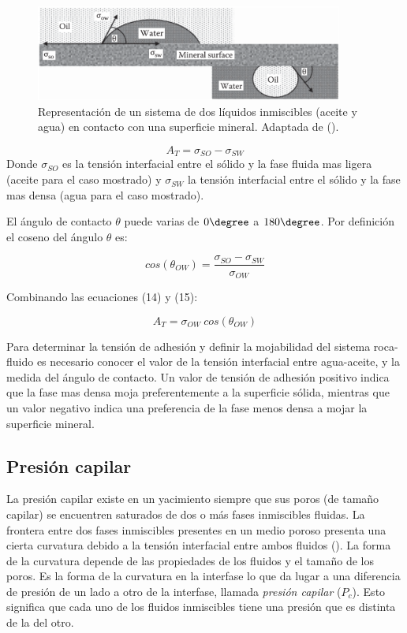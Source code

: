 \begin{figure}
    \centering
    \includegraphics[width=0.9\textwidth]{Graphics/moja1.png}
    \caption[Mojabilidad]{Representación de un sistema de dos líquidos inmiscibles (aceite y agua) en contacto con una superficie mineral. Adaptada de (\cite{Dandekar}).}
    \label{fig:moja1}
\end{figure}

\begin{equation}
A_{T}=\sigma_{SO}-\sigma_{SW}
\end{equation}
Donde $\sigma_{SO}$ es la tensión interfacial entre el sólido y la fase fluida mas ligera (aceite para el caso mostrado) y $\sigma_{SW}$ la tensión interfacial entre el sólido y la fase mas densa (agua para el caso mostrado).

El ángulo de contacto $\theta$ puede varias de $0\degree$ a $180\degree$. Por definición el coseno del ángulo $\theta$ es:

\begin{equation}
cos(\theta_{OW})= \frac{\sigma_{SO}-\sigma_{SW}}{\sigma_{OW}}
\end{equation}

Combinando las ecuaciones (14) y (15):

\begin{equation}
A_{T}=\sigma_{OW}~cos(\theta_{OW})
\end{equation}

Para determinar la tensión de adhesión y definir la mojabilidad del sistema roca-fluido
es necesario conocer el valor de la tensión interfacial entre agua-aceite, y la medida del ángulo de contacto. Un valor de tensión de adhesión positivo indica que la fase mas densa moja preferentemente a la superficie sólida, mientras que un valor negativo indica una preferencia de la fase menos densa a mojar la superficie mineral.

\subsection{Presión capilar}%
La presión capilar existe en un yacimiento siempre que sus poros (de tamaño capilar) se encuentren saturados de dos o más fases inmiscibles fluidas. La frontera entre dos fases inmiscibles presentes en un medio poroso presenta una cierta curvatura debido a la tensión interfacial entre ambos fluidos (\cite{Leverett}). La forma de la curvatura depende de las propiedades de los fluidos y el tamaño de los poros. Es la forma de la curvatura en la interfase lo que da lugar a una diferencia de presión de un lado a otro de la interfase, llamada \emph{presión capilar} ($P_{c}$). Esto significa que cada uno de los fluidos inmiscibles tiene una presión que es distinta de la del otro. 

